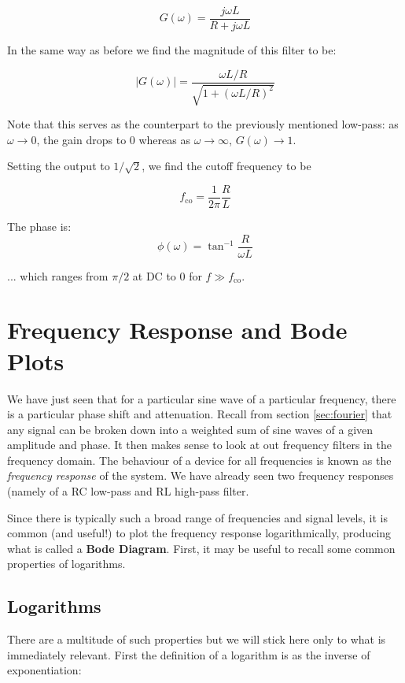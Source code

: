 \documentclass{tufte-book}
\begin{document}
$$
G(\omega) = \frac{j\omega L}{R+j\omega L}
$$

In the same way as before we find the magnitude of this filter to be:

\begin{equation}\label{eq:mag_RLHPfilt}
\vert G(\omega)\vert  = \frac{\omega L/R}{\sqrt{1 + \left(\omega L/R\right)^2}}
\end{equation}

\noindent Note that this serves as the counterpart to the previously mentioned low-pass: as $\omega \rightarrow 0$, the gain drops to 0 whereas as $\omega \rightarrow \infty$, $G(\omega) \rightarrow 1$.

\noindent Setting the output to $1/\sqrt{2}$, we find the cutoff frequency to be

\begin{equation}\label{eq:f_cutoff_RL}
f_\text{co} = \frac{1}{2\pi}\frac{R}{L}
\end{equation}

\noindent The phase is:
\begin{equation}\label{eq:phs_RLHPfilt}
\phi(\omega) = \tan^{-1}\frac{R}{\omega L}
\end{equation}

\noindent... which ranges from $\pi/2$ at DC to $0$ for $f\gg f_\text{co}$.

\section{Frequency Response and Bode Plots}
We have just seen that for a particular sine wave of a particular frequency, there is a particular phase shift and attenuation. Recall from section \ref{sec:fourier} that any signal can be broken down into a weighted sum of sine waves of a given amplitude and phase. It then makes sense to look at out frequency filters in the frequency domain. The behaviour of a device for all frequencies is known as the \textit{frequency response} of the system. We have already seen two frequency responses (namely of a RC low-pass and RL high-pass filter.

Since there is typically such a broad range of frequencies and signal levels, it is common (and useful!) to plot the frequency response logarithmically, producing what is called a \textbf{Bode Diagram}. First, it may be useful to recall some common properties of logarithms. 

\subsection{Logarithms}
There are a multitude of such properties  but we will stick here only to what is immediately relevant. First the definition of a logarithm is as the inverse of exponentiation:
\end{document}
